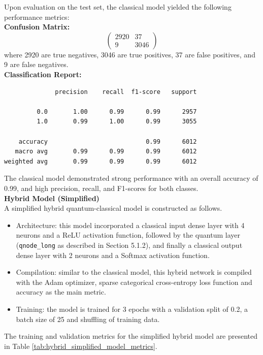 \documentclass[10pt]{article}
\begin{document}
\noindent Upon evaluation on the test set, the classical model yielded the following performance metrics:\\
\textbf{Confusion Matrix:}
\[
\begin{pmatrix}
    2920 & 37 \\
    9 & 3046
\end{pmatrix}
\]
where 2920 are true negatives, 3046 are true positives, 37 are false positives, and 9 are false negatives.\\
\textbf{Classification Report:}
\begin{verbatim}
              precision    recall  f1-score   support

         0.0       1.00      0.99      0.99      2957
         1.0       0.99      1.00      0.99      3055

    accuracy                           0.99      6012
   macro avg       0.99      0.99      0.99      6012
weighted avg       0.99      0.99      0.99      6012
\end{verbatim}
The classical model demonstrated strong performance with an overall accuracy of 0.99, and high precision, recall, and F1-scores for both classes.\\

\noindent \textbf{Hybrid Model (Simplified)} \\
A simplified hybrid quantum-classical model is constructed as follows.
\begin{itemize}
    \item Architecture: this model incorporated a classical input dense layer with 4 neurons and a ReLU activation function, followed by the quantum layer (\texttt{qnode\_long} as described in Section 5.1.2), and finally a classical output dense layer with 2 neurons and a Softmax activation function.
    \item Compilation: similar to the classical model, this hybrid network is compiled with the Adam optimizer, sparse categorical cross-entropy loss function and accuracy as the main metric.
    \item Training: the model is trained for 3 epochs with a validation split of 0.2, a batch size of 25 and shuffling of training data.
\end{itemize}

The training and validation metrics for the simplified hybrid model are presented in Table \ref{tab:hybrid_simplified_model_metrics}.
\end{document}
